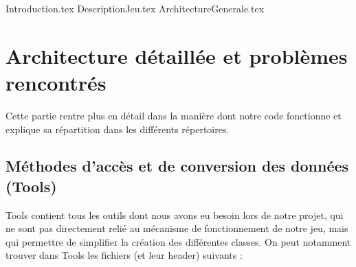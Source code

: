 \documentclass[a4paper,twoside, openany,11pt]{book}
\begin{document}
{Introduction.tex}
\newpage 
\pagestyle{PageNormale}
{DescriptionJeu.tex}
\newpage
{ArchitectureGenerale.tex}

\section{Architecture détaillée et problèmes rencontrés}
Cette partie rentre plus en détail dans la manière dont notre code fonctionne et explique sa répartition dans les différents répertoires.


\subsection{Méthodes d'accès et de conversion des données (Tools)}
Tools contient tous les outils dont nous avons eu besoin lors de notre projet, qui ne sont pas directement relié au mécanisme de fonctionnement de notre jeu, mais qui permettre de simplifier la création des différentes classes. On peut notamment trouver dans Tools les fichiers (et leur header) suivants :
\end{document}
